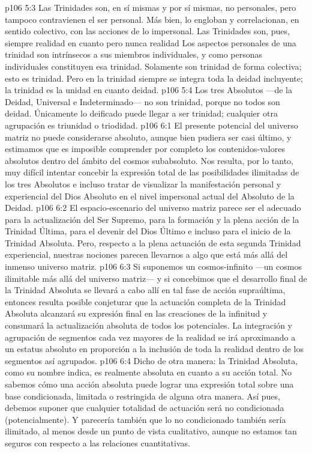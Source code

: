 \vs p106 5:3 Las Trinidades son, en sí mismas y por sí mismas, no personales, pero tampoco contravienen el ser personal. Más bien, lo engloban y correlacionan, en sentido colectivo, con las acciones de lo impersonal. Las Trinidades son, pues, siempre realidad en cuanto  pero nunca realidad  Los aspectos personales de una trinidad son intrínsecos a sus miembros individuales, y como personas individuales  constituyen esa trinidad. Solamente son trinidad de forma colectiva; esto es trinidad. Pero en la trinidad siempre se integra toda la deidad incluyente; la trinidad es la unidad en cuanto deidad.
\vs p106 5:4 Los tres Absolutos ---de la Deidad, Universal e Indeterminado--- no son trinidad, porque no todos son deidad. Únicamente lo deificado puede llegar a ser trinidad; cualquier otra agrupación es triunidad o triodidad.
\vs p106 6:1 El presente potencial del universo matriz no puede considerarse absoluto, aunque bien pudiera ser casi último, y estimamos que es imposible comprender por completo los contenidos\hyp{}valores absolutos dentro del ámbito del cosmos subabsoluto. Nos resulta, por lo tanto, muy difícil intentar concebir la expresión total de las posibilidades ilimitadas de los tres Absolutos e incluso tratar de visualizar la manifestación personal y experiencial del Dios Absoluto en el nivel impersonal actual del Absoluto de la Deidad.
\vs p106 6:2 El espacio\hyp{}escenario del universo matriz parece ser el adecuado para la actualización del Ser Supremo, para la formación y la plena acción de la Trinidad Última, para el devenir del Dios Último e incluso para el inicio de la Trinidad Absoluta. Pero, respecto a la plena actuación de esta segunda Trinidad experiencial, nuestras nociones parecen llevarnos a algo que está más allá del inmenso universo matriz.
\vs p106 6:3 Si suponemos un cosmos\hyp{}infinito ---un cosmos ilimitable más allá del universo matriz--- y si concebimos que el desarrollo final de la Trinidad Absoluta se llevará a cabo allí en tal fase de acción supraúltima, entonces resulta posible conjeturar que la actuación completa de la Trinidad Absoluta alcanzará su expresión final en las creaciones de la infinitud y consumará la actualización absoluta de todos los potenciales. La integración y agrupación de segmentos cada vez mayores de la realidad se irá aproximando a un estatus absoluto en proporción a la inclusión de toda la realidad dentro de los segmentos así agrupados.
\vs p106 6:4 Dicho de otra manera: la Trinidad Absoluta, como su nombre indica, es realmente absoluta en cuanto a su acción total. No sabemos cómo una acción absoluta puede lograr una expresión total sobre una base condicionada, limitada o restringida de alguna otra manera. Así pues, debemos suponer que cualquier totalidad de actuación será no condicionada (potencialmente). Y parecería también que lo no condicionado también sería ilimitado, al menos desde un punto de vista cualitativo, aunque no estamos tan seguros con respecto a las relaciones cuantitativas.

